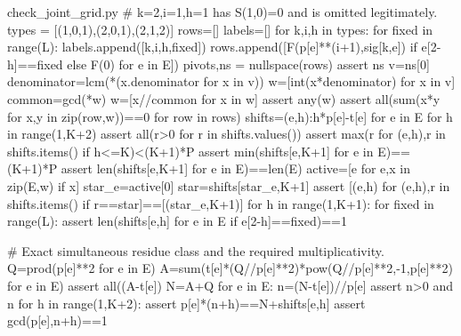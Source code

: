 \begin{filecontents*}[overwrite]{check_joint_grid.py}
    # k=2,i=1,h=1 has S(1,0)=0 and is omitted legitimately.
    types = [(1,0,1),(2,0,1),(2,1,2)]
    rows=[]
    labels=[]
    for k,i,h in types:
        for fixed in range(L):
            labels.append([k,i,h,fixed])
            rows.append([F(p[e]**(i+1),sig[k,e]) if e[2-h]==fixed else F(0) for e in E])
    pivots,ns = nullspace(rows)
    assert ns
    v=ns[0]
    denominator=lcm(*(x.denominator for x in v))
    w=[int(x*denominator) for x in v]
    common=gcd(*w)
    w=[x//common for x in w]
    assert any(w)
    assert all(sum(x*y for x,y in zip(row,w))==0 for row in rows)
    shifts={(e,h):h*p[e]-t[e] for e in E for h in range(1,K+2)}
    assert all(r>0 for r in shifts.values())
    assert max(r for (e,h),r in shifts.items() if h<=K)<(K+1)*P
    assert min(shifts[e,K+1] for e in E)==(K+1)*P
    assert len({shifts[e,K+1] for e in E})==len(E)
    active=[e for e,x in zip(E,w) if x]
    star_e=active[0]
    star=shifts[star_e,K+1]
    assert [(e,h) for (e,h),r in shifts.items() if r==star]==[(star_e,K+1)]
    for h in range(1,K+1):
        for fixed in range(L):
            assert len({shifts[e,h] for e in E if e[2-h]==fixed})==1

    # Exact simultaneous residue class and the required multiplicativity.
    Q=prod(p[e]**2 for e in E)
    A=sum(t[e]*(Q//p[e]**2)*pow(Q//p[e]**2,-1,p[e]**2) for e in E)%
    assert all((A-t[e])%
    N=A+Q
    for e in E:
        n=(N-t[e])//p[e]
        assert n>0 and n%
        for h in range(1,K+2):
            assert p[e]*(n+h)==N+shifts[e,h]
            assert gcd(p[e],n+h)==1


\end{filecontents*}
